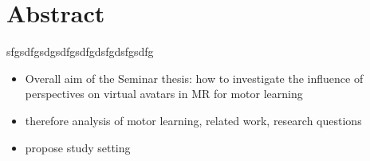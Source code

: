 \chapter*{Abstract}

	sfgsdfgsdgsdfgsdfgdsfgdsfgsdfg
\begin{itemize}
	\item Overall aim of the Seminar thesis: how to investigate the influence of perspectives on virtual avatars in MR for motor learning
	\item therefore analysis of motor learning, related work, research questions
	\item propose study setting
\end{itemize}
